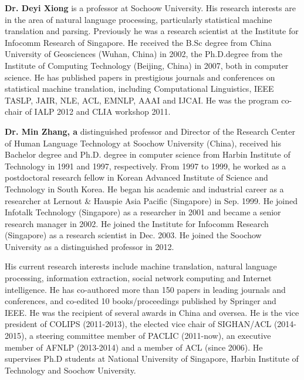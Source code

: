 \begin{bio}
\small
{\bfseries Dr. Deyi Xiong} is a professor at Sochoow University. His research interests are in the area of natural language processing, particularly statistical machine translation and parsing. Previously he was a research scientist at the Institute for Infocomm Research of Singapore. He received the B.Sc degree from China University of Geosciences (Wuhan, China) in 2002, the Ph.D.degree from the Institute of Computing Technology (Beijing, China) in 2007, both in computer science. He has published papers in prestigious journals and conferences on statistical machine translation, including Computational Linguistics, IEEE TASLP, JAIR, NLE, ACL, EMNLP, AAAI and IJCAI. He was the program co-chair of IALP 2012 and CLIA workshop 2011.

{\bfseries Dr. Min Zhang, a }distinguished professor and Director of the Research Center of Human Language Technology at Soochow University (China), received his Bachelor degree and Ph.D. degree in computer science from Harbin Institute of Technology in 1991 and 1997, respectively. From 1997 to 1999, he worked as a postdoctoral research fellow in Korean Advanced Institute of Science and Technology in South Korea. He began his academic and industrial career as a researcher at Lernout \& Hauspie Asia Pacific (Singapore) in Sep. 1999. He joined Infotalk Technology (Singapore) as a researcher in 2001 and became a senior research manager in 2002. He joined the Institute for Infocomm Research (Singapore) as a research scientist in Dec. 2003. He joined the Soochow University as a distinguished professor in 2012.

His current research interests include machine translation, natural language processing, information extraction, social network computing and Internet intelligence. He has co-authored more than 150 papers in leading journals and conferences, and co-edited 10 books/proceedings published by Springer and IEEE. He was the recipient of several awards in China and oversea. He is the vice president of COLIPS (2011-2013), the elected vice chair of SIGHAN/ACL (2014-2015), a steering committee member of PACLIC (2011-now), an executive member of AFNLP (2013-2014) and a member of ACL (since 2006). He supervises Ph.D students at National University of Singapore, Harbin Institute of Technology and Soochow University.
\end{bio}

